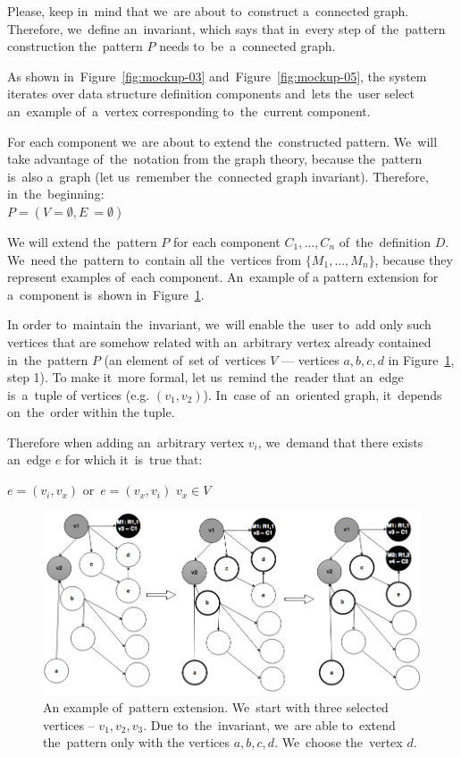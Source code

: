 Please, keep in~mind that we~are about to~construct a~connected graph. Therefore, we~define an~invariant, which says that in~every 
step of~the~pattern construction the~pattern $P$ needs to~be~a~connected graph.

As shown in~Figure~\ref{fig:mockup-03} and~Figure~\ref{fig:mockup-05},
the system iterates over data 
structure definition components and~lets the~user select an~example of~a~vertex corresponding to~the~current component.

For each component we~are about 
to extend the~constructed pattern. We~will take advantage of~the~notation from the
graph theory, because the~pattern is~also a~graph (let us~remember the~connected graph invariant).
Therefore, in~the~beginning:\\

{\centering $P = (V = \emptyset, E~= \emptyset)$ \\[0.5cm]}

We will extend the~pattern $P$ for each component $C_1, ..., C_n$ of~the~definition $D$. We~need the~pattern to~contain all the~vertices from $\{M_1 ,..., 
M_n\}$, because they represent examples of~each component. An~example of
a pattern extension for a~component is~shown in~Figure~\ref{fig:pattern-enhancement}.

In order to~maintain the~invariant, we~will enable the~user to~add only such 
vertices that are somehow related with an~arbitrary vertex already contained in~the~pattern $P$ (an element of~set of~vertices $V$ --- vertices $a,b,c,d$
in Figure~\ref{fig:pattern-enhancement}, step 1).
To make it~more formal, let us~remind the~reader that an~edge is~a~tuple 
of vertices (e.g. $(v_1,v_2)$). In~case of~an~oriented graph, it~depends on~the~order within 
the tuple.

Therefore when adding an~arbitrary vertex $v_i$, we~demand that there exists an~edge $e$ for which it~is~true that:

\begin{center}
{$e = (v_i,v_x)$ or~$e = (v_x, v_i)$ \land $v_x \in V$ \\[0.5cm]}
\end{center}

\begin{figure}
	\centering
	\includegraphics[width=140mm]{img/pattern-enhancement.png}
	\caption{An example of~pattern extension. We~start with three selected vertices
	-- $v_1, v_2, v_3$. Due to~the~invariant, we~are able to~extend the~pattern only with
	the vertices $a,b,c,d$. We~choose the~vertex $d$.}
	\label{fig:pattern-enhancement}
\end{figure}

